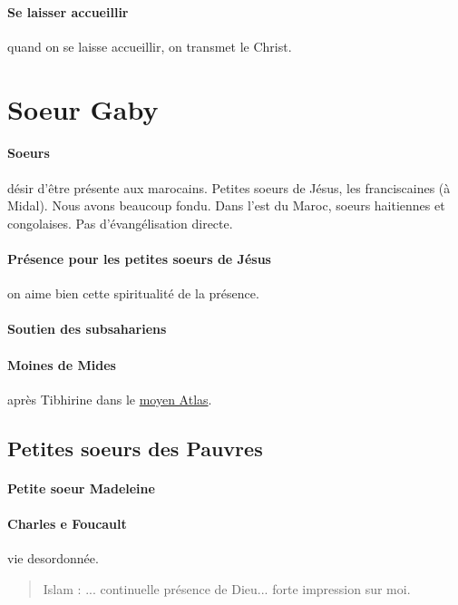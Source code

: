 \paragraph{Se laisser accueillir} quand on se laisse accueillir, on transmet le Christ.


\section{Soeur Gaby}

\paragraph{Soeurs} désir d'être présente aux marocains. Petites soeurs de Jésus, les franciscaines (à Midal). Nous avons beaucoup fondu. 
Dans l'est du Maroc, soeurs haitiennes et congolaises. Pas d'évangélisation directe. 
\paragraph{Présence pour les petites soeurs de Jésus} on aime bien cette spiritualité de la présence.

\paragraph{Soutien des subsahariens}

\paragraph{Moines de Mides} après Tibhirine dans le  \href{https://telquel.ma/2019/04/04/lheritage-des-moines-de-tibhirine-au-maroc-raconte_1633845}{moyen Atlas}.

\subsection{Petites soeurs des Pauvres}

\paragraph{Petite soeur Madeleine}

\paragraph{Charles e Foucault} vie desordonnée. 
\begin{quote}
    Islam : ... continuelle présence de Dieu... forte impression sur moi. 
\end{quote}


